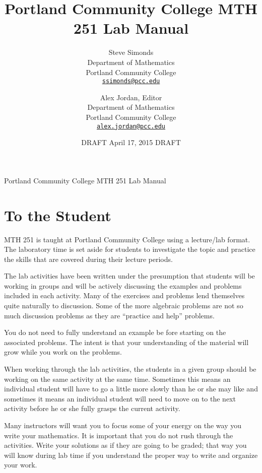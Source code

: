 \documentclass[12pt,]{book}
\title{Portland Community College MTH 251 Lab Manual}
\author{Steve Simonds\\
Department of Mathematics\\
Portland Community College\\
\href{mailto:ssimonds@pcc.edu}{\nolinkurl{ssimonds@pcc.edu}}
\and
Alex Jordan, Editor\\
Department of Mathematics\\
Portland Community College\\
\href{mailto:alex.jordan@pcc.edu}{\nolinkurl{alex.jordan@pcc.edu}}
}
\date{DRAFT April 17, 2015 DRAFT}
\theoremstyle{plain}
\theoremstyle{definition}
\numberwithin{equation}{section}
\begin{document}
\frontmatter
\thispagestyle{empty}
\begin{center}
{\Huge Portland Community College MTH 251 Lab Manual}
\end{center}\par
{}
\clearpage
\thispagestyle{empty}
\clearpage
\maketitle
\clearpage
\thispagestyle{empty}
\clearpage
\setcounter{tocdepth}{1}
\renewcommand*\contentsname{Contents}
\tableofcontents
\chapter*{To the Student}\label{to-the-student}
MTH 251 is taught at Portland Community College using a lecture/lab format. The laboratory time is set aside for students to investigate the topic and practice the skills that are covered during their lecture periods.%
\par
The lab activities have been written under the presumption that students will be working in groups and will be actively discussing the examples and problems included in each activity. Many of the exercises and problems lend themselves quite naturally to discussion. Some of the more algebraic problems are not so much discussion problems as they are ``practice and help'' problems.%
\par
You do not need to fully understand an example be fore starting on the associated problems. The intent is that your understanding of the material will grow while you work on the problems.%
\par
When working through the lab activities, the students in a given group should be working on the same activity at the same time. Sometimes this means an individual student will have to go a little more slowly than he or she may like and sometimes it means an individual student will need to move on to the next activity before he or she fully grasps the current activity.%
\par
Many instructors will want you to focus some of your energy on the way you write your mathematics. It is important that you do not rush through the activities. Write your solutions as if they are going to be graded; that way you will know during lab time if you understand the proper way to write and organize your work.%
\end{document}
